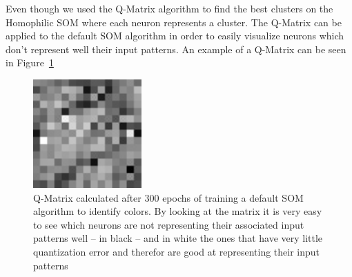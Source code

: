 Even though we used the Q-Matrix algorithm to find the best clusters on the Homophilic \ac{SOM} where each neuron represents a cluster. The Q-Matrix can be applied to the default \ac{SOM} algorithm in order to easily visualize neurons which don't represent well their input patterns. An example of a Q-Matrix can be seen in Figure~\ref{fig:som_trqmatrix}
\begin{figure}[htpb]
  \centering
  \includegraphics[scale=2]{./images/som_training/2_quantmatrix.pdf}
  \caption{Q-Matrix calculated after 300 epochs of training a default \ac{SOM} algorithm to identify colors. By looking at the matrix it is very easy to see which neurons are not representing their associated input patterns well -- in black -- and in white the ones that have very little quantization error and therefor are good at representing their input patterns}
  \label{fig:som_trqmatrix}
\end{figure}

